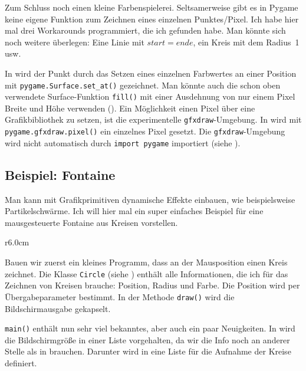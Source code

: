 Zum Schluss noch einen kleine Farbenspielerei. Seltsamerweise gibt es in Pygame keine eigene Funktion zum Zeichnen eines einzelnen Punktes/Pixel. Ich habe hier mal drei Workarounds programmiert, die ich gefunden habe. Man könnte sich noch weitere überlegen: Eine Linie mit $start=ende$, ein Kreis mit dem Radius~1 usw.

In  wird der Punkt durch das Setzen eines einzelnen Farbwertes an einer Position mit \texttt{pygame.Surface.set\_at()} gezeichnet. Man könnte auch die schon oben verwendete Surface-Funktion \texttt{fill()} mit einer Ausdehnung von nur einem Pixel Breite und Höhe verwenden (). Ein Möglichkeit einen Pixel über eine Grafikbibliothek zu setzen, ist die experimentelle \texttt{gfxdraw}-Umgebung. In  wird mit \texttt{pygame.gfxdraw.pixel()} ein einzelnes Pixel gesetzt. Die \texttt{gfxdraw}-Umgebung wird nicht automatisch durch \texttt{import pygame} importiert (siehe ).

\subsection{Beispiel: Fontaine}

Man kann mit Grafikprimitiven dynamische Effekte einbauen, wie beispielsweise Partikelschwärme. Ich will hier mal ein super einfaches Beispiel für eine mausgesteuerte Fontaine aus Kreisen vorstellen.

\begin{wrapfigure}[20]{r}{6.0cm}%
	\begin{center}%
		\vspace{-1cm}%
	\end{center}%
\end{wrapfigure}%
Bauen wir zuerst ein kleines Programm, dass an der Mausposition einen Kreis zeichnet. Die Klasse \texttt{Circle} (siehe ) enthält alle Informationen, die ich für das Zeichnen von Kreisen brauche: Position, Radius und Farbe. Die Position wird per Übergabeparameter bestimmt. In der Methode  \texttt{draw()} wird die Bildschirmausgabe gekapselt.

\texttt{main()} enthält nun sehr viel bekanntes, aber auch ein paar Neuigkeiten. In  wird die Bildschirmgröße in einer Liste vorgehalten, da wir die Info noch an anderer Stelle als in  brauchen. Darunter wird in  eine Liste für die Aufnahme der Kreise definiert. 

